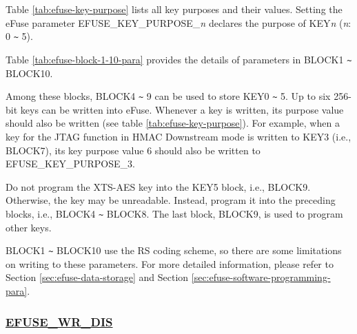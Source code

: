 \documentclass[main\_\_EN.tex]{subfiles}
\begin{document}
\clearpage
\begin{landscape}



\end{landscape}
\restoregeometry
\clearpage


Table \ref{tab:efuse-key-purpose} lists all key purposes and their values. Setting the eFuse parameter EFUSE\_KEY\_PURPOSE\_\textcolor{myred}{\it{n}} declares the purpose of KEY\textcolor{myred}{\it{n}} (\textcolor{myred}{\it{n}}: 0 \verb+~+ 5).



Table  \ref{tab:efuse-block-1-10-para} provides the details of parameters in BLOCK1 \verb+~+ BLOCK10.

\clearpage
\begin{landscape}



\end{landscape}
\restoregeometry
\clearpage



Among these blocks, BLOCK4 \verb+~+ 9 can be used to store KEY0 \verb+~+ 5. Up to six 256-bit keys can be written into eFuse. Whenever a key is written, its purpose value should also be written (see table \ref{tab:efuse-key-purpose}). For example, when a key for the JTAG function in HMAC Downstream mode is written to KEY\textcolor{myred}{3} (i.e., BLOCK7), its key purpose value 6 should also be written to EFUSE\_KEY\_PURPOSE\_\textcolor{myred}{3}.

\begin{tiplisting}
Do not program the XTS-AES key into the KEY5 block, i.e., BLOCK9. Otherwise, the key may be unreadable. Instead, program it into the preceding blocks, i.e., BLOCK4 \verb+~+ BLOCK8. The last block, BLOCK9, is used to program other keys.
\end{tiplisting}

BLOCK1 \verb+~+ BLOCK10 use the RS coding scheme, so there are some limitations on writing to these parameters. For more detailed information, please refer to Section \ref{sec:efuse-data-storage} and Section \ref{sec:efuse-software-programming-para}.

\subsubsection{\hyperref[fielddesc:EFUSEWRDIS]{EFUSE\_WR\_DIS}}
\label{sec:efuse-wr-dis}
\end{document}
